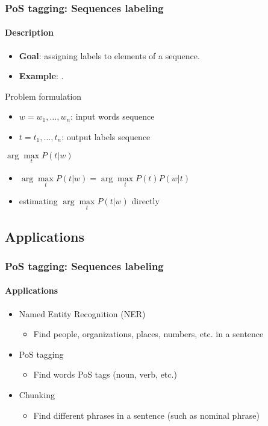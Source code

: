\documentclass[xcolor=table]{beamer}
\begin{document}
\begin{frame}
\frametitle{PoS tagging: Sequences labeling}
\framesubtitle{Description}


\begin{itemize}
	\item \textbf{Goal}: assigning labels to elements of a sequence.
	\item \textbf{Example}: .
\end{itemize}

\begin{block}{Problem formulation}
	\begin{itemize}
		\item $w = w_1, \ldots, w_n$: input words sequence
		\item $t = t_1, \ldots, t_n$: output labels sequence
	\end{itemize}
	\begin{center}
		$ \arg\max\limits_t P(t | w)$
	\end{center}
	
	\begin{itemize}
		\item {} $ \arg\max\limits_t P(t | w) = \arg\max\limits_t P(t) P(w | t) $
		\item {} estimating $\arg\max\limits_t P(t | w)$ directly
	\end{itemize}
\end{block}

\end{frame}

\subsection{Applications}

\begin{frame}
\frametitle{PoS tagging: Sequences labeling}
\framesubtitle{Applications}

\begin{itemize}
	\item Named Entity Recognition (NER)
	\begin{itemize}
		\item Find people, organizations, places, numbers, etc. in a sentence
	\end{itemize}
	\item PoS tagging
	\begin{itemize}
		\item Find words PoS tags (noun, verb, etc.)
	\end{itemize}
	\item Chunking
	\begin{itemize}
		\item Find different phrases in a sentence (such as nominal phrase)
	\end{itemize}
\end{itemize}


\end{frame}
\end{document}
